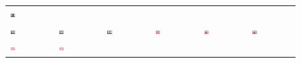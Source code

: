 \documentclass[book.tex]{subfiles}
\begin{document}
\begin{figure}[H]
\begin{table}[H]
\begin{tabularx}{\textwidth}[c]{XXXXXX}
  \includegraphics[width=0.15\textwidth]{screenshots_300dpi/game/picture18.jpg} \\
  \includegraphics[width=0.15\textwidth]{screenshots_300dpi/game/picture19.jpg} &
  \includegraphics[width=0.15\textwidth]{screenshots_300dpi/game/picture20.jpg} &
  \includegraphics[width=0.15\textwidth]{screenshots_300dpi/game/picture21.jpg} &
  \includegraphics[width=0.15\textwidth]{screenshots_300dpi/game/picture22.jpg} &
  \includegraphics[width=0.15\textwidth]{screenshots_300dpi/game/picture23.jpg} &
  \includegraphics[width=0.15\textwidth]{screenshots_300dpi/game/picture24.jpg} \\
  \includegraphics[width=0.15\textwidth]{screenshots_300dpi/game/picture25.jpg} &
  \includegraphics[width=0.15\textwidth]{screenshots_300dpi/game/picture26.jpg} &

\end{tabularx}
\end{table}
\end{figure}
\end{document}
